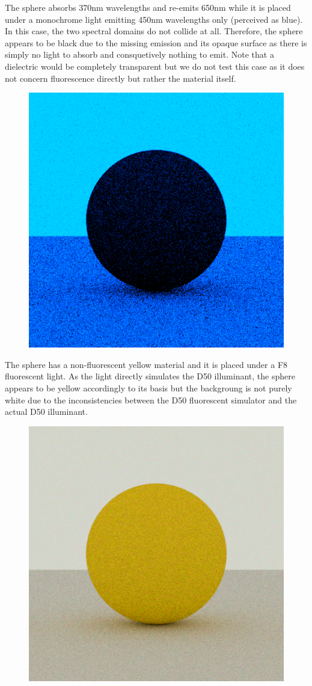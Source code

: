 \begin{description}
\begin{figure}[H]
		\caption{}
		\label{fig:fluorescent_sphere_mono_red}
	\end{figure}
	\item[450nm illuminant, 370nm absorption, 650 emission~\ref{fig:fluorescent_sphere_mono_invisible}] The sphere absorbs 370nm wavelengths and re-emits 650nm while it is placed under a monochrome light emitting 450nm wavelengths only (perceived as blue). In this case, the two spectral domains do not collide at all. Therefore, the sphere appears to be black due to the missing emission and its opaque surface as there is simply no light to absorb and consquetively nothing to emit. Note that a dielectric would be completely transparent but we do not test this case as it does not concern fluorescence directly but rather the material itself.
	\begin{figure}[H]
		\centering
		\includegraphics[width=.6\linewidth]{img/fluorescent_sphere_mono_invisible.png}
		\caption{}
		\label{fig:fluorescent_sphere_mono_invisible}
	\end{figure}
	\item[Fluo illuminant, non fluo sphere~\ref{fig:fluorescent_sphere_fluoD50_nonfluo}] The sphere has a non-fluorescent yellow material and it is placed under a F8 fluorescent light. As the light directly simulates the D50 illuminant, the sphere appears to be yellow accordingly to its basis but the backgroung is not purely white due to the inconsistencies between the D50 fluorescent simulator and the actual D50 illuminant.
	\begin{figure}[H]
		\centering
		\includegraphics[width=.6\linewidth]{img/fluorescent_sphere_fluoD50_nonfluo.png}

\end{figure}
\end{description}
